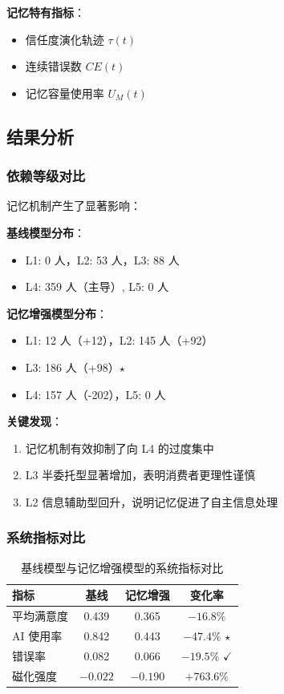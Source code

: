 \documentclass[a4paper,12pt]{article}
\begin{document}
\textbf{记忆特有指标}：
\begin{itemize}
    \item 信任度演化轨迹 $\tau(t)$
    \item 连续错误数 $CE(t)$
    \item 记忆容量使用率 $U_M(t)$
\end{itemize}

\subsection{结果分析}

\subsubsection{依赖等级对比}

记忆机制产生了显著影响：

\textbf{基线模型分布}：
\begin{itemize}
    \item L1: 0 人，L2: 53 人，L3: 88 人
    \item L4: 359 人（主导）, L5: 0 人
\end{itemize}

\textbf{记忆增强模型分布}：
\begin{itemize}
    \item L1: 12 人（+12），L2: 145 人（+92）
    \item L3: 186 人（+98）$\star$
    \item L4: 157 人（-202），L5: 0 人
\end{itemize}

\textbf{关键发现}：
\begin{enumerate}
    \item 记忆机制有效抑制了向 L4 的过度集中
    \item L3 半委托型显著增加，表明消费者更理性谨慎
    \item L2 信息辅助型回升，说明记忆促进了自主信息处理
\end{enumerate}

\subsubsection{系统指标对比}

\begin{table}[H]
\centering
\caption{基线模型与记忆增强模型的系统指标对比}
\begin{tabular}{lccc}
\toprule
\textbf{指标} & \textbf{基线} & \textbf{记忆增强} & \textbf{变化率} \\
\midrule
平均满意度 & 0.439 & 0.365 & $-16.8\%$ \\
AI 使用率 & 0.842 & 0.443 & $-47.4\%$ $\star$ \\
错误率 & 0.082 & 0.066 & $-19.5\%$ $\checkmark$ \\
磁化强度 & $-0.022$ & $-0.190$ & $+763.6\%$ \\
\bottomrule
\end{tabular}
\end{table}
\end{document}
